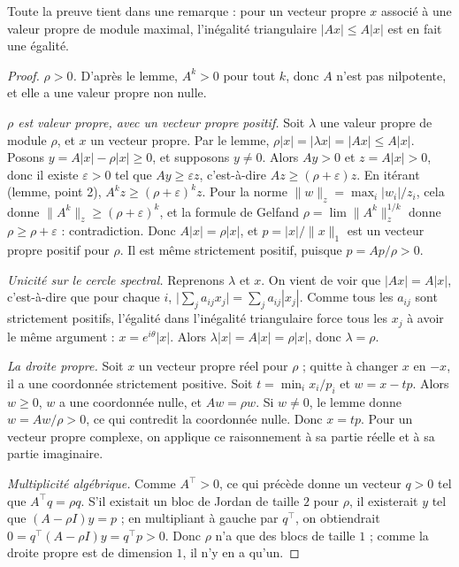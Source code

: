 \documentclass[11pt,a4paper]{article}
\theoremstyle{plain}
\theoremstyle{definition}
\theoremstyle{remark}
\begin{document}
Toute la preuve tient dans une remarque : pour un vecteur propre $x$ associé à une valeur propre de module maximal, l'inégalité triangulaire $|Ax|\leq A|x|$ est en fait une égalité.

\begin{proof}
\emph{$\rho>0$.} D'après le lemme, $A^k>0$ pour tout $k$, donc $A$ n'est pas nilpotente, et elle a une valeur propre non nulle.

\emph{$\rho$ est valeur propre, avec un vecteur propre positif.} Soit $\lambda$ une valeur propre de module $\rho$, et $x$ un vecteur propre. Par le lemme, $\rho|x|=|\lambda x|=|Ax|\leq A|x|$. Posons $y=A|x|-\rho|x|\geq0$, et supposons $y\neq0$. Alors $Ay>0$ et $z=A|x|>0$, donc il existe $\varepsilon>0$ tel que $Ay\geq\varepsilon z$, c'est-à-dire $Az\geq(\rho+\varepsilon)z$. En itérant (lemme, point 2), $A^kz\geq(\rho+\varepsilon)^kz$. Pour la norme $\|w\|_z=\max_i|w_i|/z_i$, cela donne $\|A^k\|_z\geq(\rho+\varepsilon)^k$, et la formule de Gelfand $\rho=\lim\|A^k\|_z^{1/k}$ donne $\rho\geq\rho+\varepsilon$ : contradiction. Donc $A|x|=\rho|x|$, et $p=|x|/\|x\|_1$ est un vecteur propre positif pour $\rho$. Il est même strictement positif, puisque $p=Ap/\rho>0$.

\emph{Unicité sur le cercle spectral.} Reprenons $\lambda$ et $x$. On vient de voir que $|Ax|=A|x|$, c'est-à-dire que pour chaque $i$, $\big|\sum_ja_{ij}x_j\big|=\sum_ja_{ij}|x_j|$. Comme tous les $a_{ij}$ sont strictement positifs, l'égalité dans l'inégalité triangulaire force tous les $x_j$ à avoir le même argument : $x=e^{i\theta}|x|$. Alors $\lambda|x|=A|x|=\rho|x|$, donc $\lambda=\rho$.

\emph{La droite propre.} Soit $x$ un vecteur propre réel pour $\rho$ ; quitte à changer $x$ en $-x$, il a une coordonnée strictement positive. Soit $t=\min_ix_i/p_i$ et $w=x-tp$. Alors $w\geq0$, $w$ a une coordonnée nulle, et $Aw=\rho w$. Si $w\neq0$, le lemme donne $w=Aw/\rho>0$, ce qui contredit la coordonnée nulle. Donc $x=tp$. Pour un vecteur propre complexe, on applique ce raisonnement à sa partie réelle et à sa partie imaginaire.

\emph{Multiplicité algébrique.} Comme $A^\top>0$, ce qui précède donne un vecteur $q>0$ tel que $A^\top q=\rho q$. S'il existait un bloc de Jordan de taille $2$ pour $\rho$, il existerait $y$ tel que $(A-\rho I)y=p$ ; en multipliant à gauche par $q^\top$, on obtiendrait $0=q^\top(A-\rho I)y=q^\top p>0$. Donc $\rho$ n'a que des blocs de taille $1$ ; comme la droite propre est de dimension $1$, il n'y en a qu'un.
\end{proof}
\end{document}
